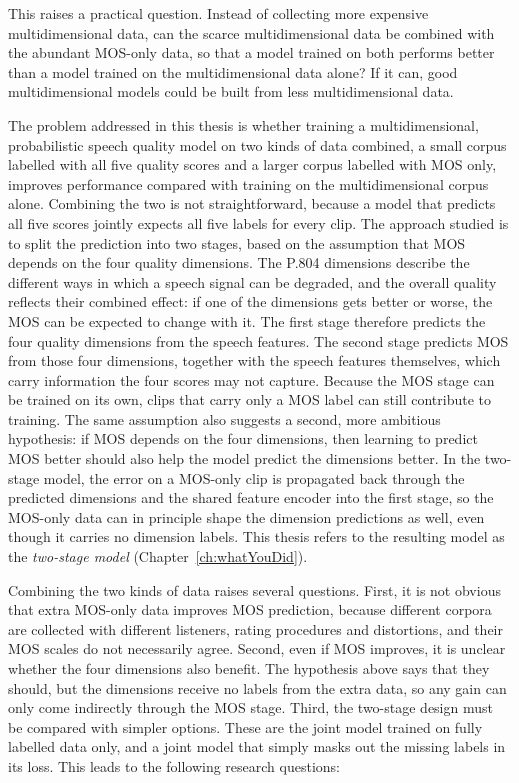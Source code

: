\documentclass[
english,                 %
bibtex,                  %
includeExtraAbstracts, %
]{kththesis}
\numberwithin{listing}{chapter}
\begin{document}
This raises a practical question. Instead of collecting more expensive multidimensional data, can the scarce multidimensional data be combined with the abundant MOS-only data, so that a model trained on both performs better than a model trained on the multidimensional data alone? If it can, good multidimensional models could be built from less multidimensional data.

The problem addressed in this thesis is whether training a multidimensional, probabilistic speech quality model on two kinds of data combined, a small corpus labelled with all five quality scores and a larger corpus labelled with MOS only, improves performance compared with training on the multidimensional corpus alone. Combining the two is not straightforward, because a model that predicts all five scores jointly expects all five labels for every clip. The approach studied is to split the prediction into two stages, based on the assumption that MOS depends on the four quality dimensions. The P.804 dimensions describe the different ways in which a speech signal can be degraded, and the overall quality reflects their combined effect: if one of the dimensions gets better or worse, the MOS can be expected to change with it. The first stage therefore predicts the four quality dimensions from the speech features. The second stage predicts MOS from those four dimensions, together with the speech features themselves, which carry information the four scores may not capture. Because the MOS stage can be trained on its own, clips that carry only a MOS label can still contribute to training. The same assumption also suggests a second, more ambitious hypothesis: if MOS depends on the four dimensions, then learning to predict MOS better should also help the model predict the dimensions better. In the two-stage model, the error on a MOS-only clip is propagated back through the predicted dimensions and the shared feature encoder into the first stage, so the MOS-only data can in principle shape the dimension predictions as well, even though it carries no dimension labels. This thesis refers to the resulting model as the \emph{two-stage model} (Chapter~\ref{ch:whatYouDid}).

Combining the two kinds of data raises several questions. First, it is not obvious that extra MOS-only data improves MOS prediction, because different corpora are collected with different listeners, rating procedures and distortions, and their MOS scales do not necessarily agree. Second, even if MOS improves, it is unclear whether the four dimensions also benefit. The hypothesis above says that they should, but the dimensions receive no labels from the extra data, so any gain can only come indirectly through the MOS stage. Third, the two-stage design must be compared with simpler options. These are the joint model trained on fully labelled data only, and a joint model that simply masks out the missing labels in its loss. This leads to the following research questions:
\end{document}
